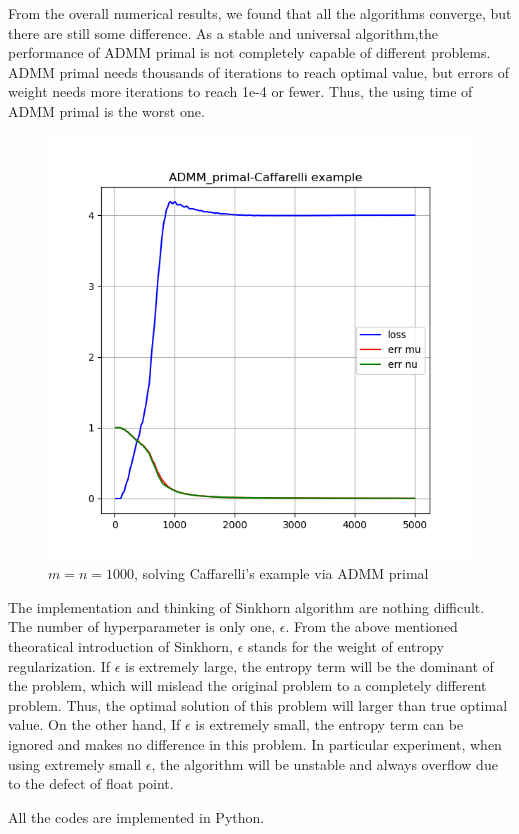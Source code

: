\documentclass{article}
\begin{document}
\begin{large}
From the overall numerical results,  we found that all the algorithms converge, but there are still some difference. As a stable and universal algorithm,the performance of ADMM primal is  not completely capable of different problems. ADMM primal needs thousands of iterations to reach optimal value, but errors of weight needs more iterations to reach 1e-4 or fewer. Thus, the using time of ADMM primal is the worst one.
\begin{figure}[h]
  \centering
  \includegraphics[width=.8\textwidth]{loss1.png}
  \captionsetup{justification=centering}
  \caption{\label{fig:loss}$m=n=1000$, solving Caffarelli’s example via ADMM primal}
\end{figure}

The implementation and thinking of Sinkhorn algorithm are nothing difficult. The number of hyperparameter is only one, $\epsilon$. From the above mentioned theoratical introduction of Sinkhorn, $\epsilon$ stands for the weight of entropy regularization. If $\epsilon$ is extremely large, the entropy term will be the dominant of the problem, which will mislead the original problem to a completely different problem. Thus, the optimal solution of this problem will larger than true optimal value. On the other hand, If $\epsilon$ is extremely small, the entropy term can be ignored and makes no difference in this problem. In particular experiment, when using extremely small $\epsilon$, the algorithm will be unstable and always overflow due to the defect of float point.

All the codes are implemented in Python. 

\end{large}
\end{document}
